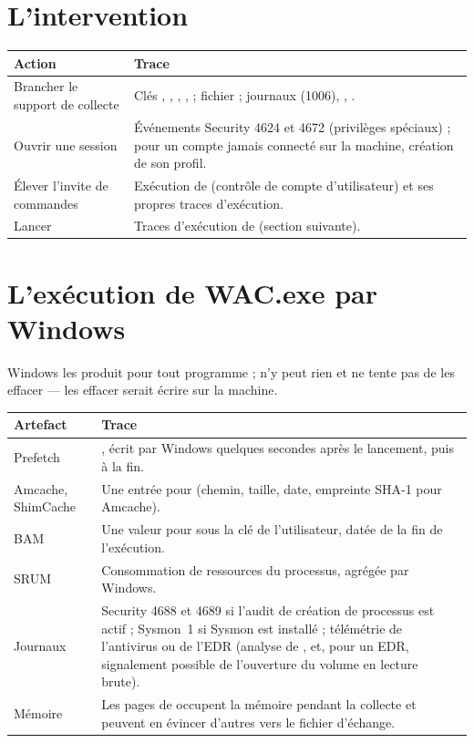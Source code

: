 \documentclass[11pt,a4paper,oneside]{report}
\begin{document}
\section{L'intervention}

\begin{longtable}{@{}L{4.3cm}L{10.1cm}@{}}
\toprule
\bfseries Action & \bfseries Trace \\
\midrule
\endhead
Brancher le support de collecte & Clés , ,
  , ,
   ; fichier  ; journaux
   (1006),
  , . \\
Ouvrir une session & Événements Security 4624 et 4672 (privilèges spéciaux) ;
  pour un compte jamais connecté sur la machine, création de son profil. \\
Élever l'invite de commandes & Exécution de  (contrôle de
  compte d'utilisateur) et ses propres traces d'exécution. \\
Lancer  & Traces d'exécution de 
  (section suivante). \\
\bottomrule
\end{longtable}

\section{L'exécution de WAC.exe par Windows}

Windows les produit pour tout programme ; \wac{} n'y peut rien et ne tente pas
de les effacer — les effacer serait écrire sur la machine.

\begin{longtable}{@{}L{4.3cm}L{10.1cm}@{}}
\toprule
\bfseries Artefact & \bfseries Trace \\
\midrule
\endhead
Prefetch & , écrit par Windows quelques secondes après le
  lancement, puis à la fin. \\
Amcache, ShimCache & Une entrée pour  (chemin, taille, date,
  empreinte SHA-1 pour Amcache). \\
BAM & Une valeur pour  sous la clé de l'utilisateur, datée de
  la fin de l'exécution. \\
SRUM & Consommation de ressources du processus, agrégée par Windows. \\
Journaux & Security 4688 et 4689 si l'audit de création de processus est actif ;
  Sysmon~1 si Sysmon est installé ; télémétrie de l'antivirus ou de l'EDR
  (analyse de , et, pour un EDR, signalement possible de
  l'ouverture du volume en lecture brute). \\
Mémoire & Les pages de \wac{} occupent la mémoire pendant la collecte et
  peuvent en évincer d'autres vers le fichier d'échange. \\
\bottomrule
\end{longtable}
\end{document}
